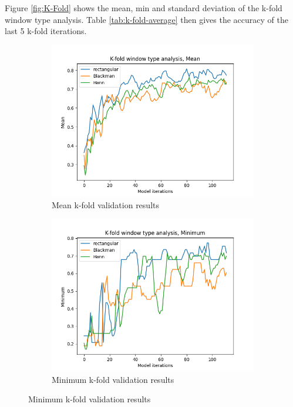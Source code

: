 \documentclass[class=report,11pt,crop=false]{standalone}
\begin{document}
Figure \ref{fig:K-Fold} shows the mean, min and standard deviation of the k-fold window type analysis. Table \ref{tab:k-fold-average} then gives the accuracy of the last 5 k-fold iterations.

\begin{figure}[ht]
    \begin{subfigure}[b]{0.5\textwidth}
        \includegraphics[width=\linewidth]{Images/kfoldMean.png}
        \caption{Mean k-fold validation results}
        \label{fig:KMean}
    \end{subfigure}
    \hfill
    \begin{subfigure}[b]{0.5\textwidth}
        \includegraphics[width=\linewidth]{Images/kfoldMinimum.png}
        \caption{Minimum k-fold validation results}

\end{subfigure}
\end{figure}
\end{document}
